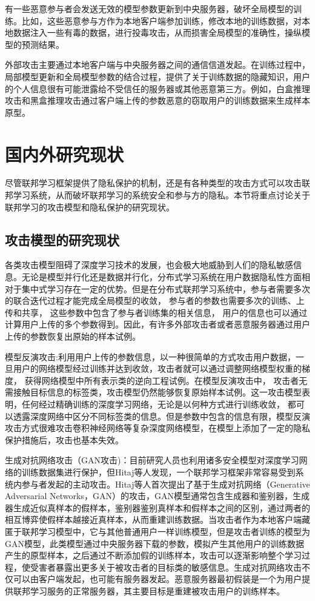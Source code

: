 有一些恶意参与者会发送无效的模型参数更新到中央服务器，破坏全局模型的训练。比如，这些恶意参与方作为本地客户端参加训练，修改本地的训练数据，对本地数据注入一些有毒的数据，进行投毒攻击，从而损害全局模型的准确性，操纵模型的预测结果。

外部攻击主要通过本地客户端与中央服务器之间的通信信道发起。在训练过程中，局部模型更新和全局模型参数的结合过程，提供了关于训练数据的隐藏知识，用户的个人信息很有可能泄露给不受信任的服务器或其他恶意第三方。例如，白盒推理攻击和黑盒推理攻击通过客户端上传的参数恶意的窃取用户的训练数据来生成样本原型。

\section{国内外研究现状}
尽管联邦学习框架提供了隐私保护的机制，还是有各种类型的攻击方式可以攻击联邦学习系统，从而破坏联邦学习的系统安全和参与方的隐私。本节将重点讨论关于联邦学习的攻击模型和隐私保护的研究现状。

\subsection{攻击模型的研究现状}
各类攻击模型阻碍了深度学习技术的发展，也会极大地威胁到人们的隐私敏感信息。无论是模型并行化还是数据并行化，分布式学习系统在用户数据隐私性方面相对于集中式学习存在一定的优势。但是在分布式联邦学习系统中，参与者需要多次的联合迭代过程才能完成全局模型的收敛， 参与者的参数也需要多次的训练、上传和共享， 这些参数中包含了参与者训练集的相关信息， 用户的信息也可以通过计算用户上传的多个参数得到。因此，有许多外部攻击者或者恶意服务器通过用户上传的参数恢复出原始的样本试例。

模型反演攻击:利用用户上传的参数信息，以一种很简单的方式攻击用户数据，一旦用户的网络模型经过训练并达到收敛，攻击者就可以通过调整网络模型权重的梯度， 获得网络模型中所有表示类的逆向工程试例。在模型反演攻击中， 攻击者无需接触目标信息的标签类，攻击模型仍然能够恢复原始样本试例。这一攻击模型表明，任何经过精确训练的深度学习网络，无论是以何种方式进行训练收敛， 都可以透露深度网络中区分不同标签类的信息。但是参数中包含的信息有限，模型反演攻击方式很难攻击卷积神经网络等复杂深度网络模型，在模型上添加了一定的隐私保护措施后，攻击也基本失效。

生成对抗网络攻击（GAN攻击)：目前研究人员也利用诸多安全模型对深度学习网络的训练数据集进行保护，但Hitaj等人发现，一个联邦学习框架非常容易受到系统内参与者发起的主动攻击。Hitaj等人首次提出了基于生成对抗网络（Generative Adversarial Networks，GAN）的攻击，GAN模型通常包含生成器和鉴别器，生成器生成近似真样本的假样本，鉴别器鉴别真样本和假样本之间的区别，通过两者的相互博弈使假样本越接近真样本，从而重建训练数据。当攻击者作为本地客户端藏匿于联邦学习模型中，它与其他普通用户一样训练模型，但是攻击者训练的模型为GAN模型，此类模型通过中央服务器下载的参数，模拟产生其他用户的训练数据产生的原型样本，之后通过不断添加假的训练样本，攻击可以逐渐影响整个学习过程，使受害者暴露出更多关于被攻击者的目标类的敏感信息。生成对抗网络攻击不仅可以由客户端发起，也可能有服务器发起。恶意服务器最初假装是一个为用户提供联邦学习服务的正常服务器，其主要目标是重建被攻击用户的训练样本。

